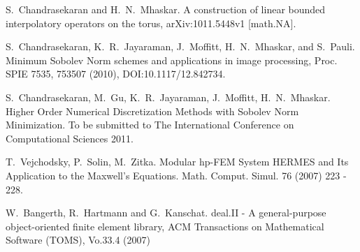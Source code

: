 
\begin{thebibliography}{10}
{\sc S.~Chandrasekaran and H.~N.~Mhaskar}. {A construction of linear bounded interpolatory operators on the torus}, arXiv:1011.5448v1 [math.NA].

{\sc S.~Chandrasekaran, K.~R.~Jayaraman, J.~Moffitt, H.~N.~Mhaskar, and S.~Pauli}. {Minimum Sobolev Norm schemes and applications in image processing}, Proc. SPIE 7535, 753507 (2010), DOI:10.1117/12.842734.

{\sc S.~Chandrasekaran, M.~Gu, K.~R.~Jayaraman, J.~Moffitt, H.~N.~Mhaskar}. {Higher Order Numerical Discretization Methods with Sobolev Norm Minimization}. To be submitted to The International Conference on Computational Sciences 2011.

{\sc T.~Vejchodsky, P.~Solin, M.~Zitka}. {Modular hp-FEM System HERMES and Its Application to the Maxwell's Equations}. Math. Comput. Simul. 76 (2007) 223 - 228.

{\sc W.~Bangerth, R.~Hartmann and G.~Kanschat}. {deal.II - A general-purpose object-oriented finite element library}, ACM Transactions on Mathematical Software (TOMS), Vo.33.4 (2007)
\end{thebibliography}